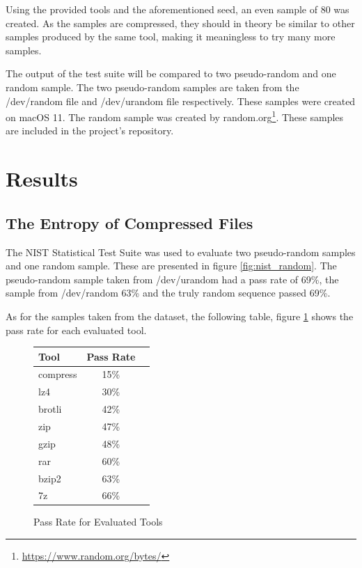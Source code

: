 \documentclass[conference]{IEEEtran}
\begin{document}
Using the provided tools and the aforementioned seed, an even sample of 80 was created. As the samples are compressed, they should in theory be similar to other samples produced by the same tool, making it meaningless to try many more samples\cite{HORNEY2013}.

The output of the test suite will be compared to two pseudo-random and one random sample. The two pseudo-random samples are taken from the /dev/random file and /dev/urandom file respectively. These samples were created on macOS 11. The random sample was created by random.org\footnote{\href{https://www.random.org/bytes/}{https://www.random.org/bytes/}}. These samples are included in the project's repository.


\section{Results}

\subsection{The Entropy of Compressed Files}

The NIST Statistical Test Suite was used to evaluate two pseudo-random samples and one random sample. These are presented in figure \ref{fig:nist_random}. The pseudo-random sample taken from /dev/urandom had a pass rate of 69\%, the sample from /dev/random 63\% and the truly random sequence passed 69\%.

As for the samples taken from the dataset, the following table, figure \ref{fig:nist_samples} shows the pass rate for each evaluated tool.

\begin{figure}[H]
    \centering
    \begin{tabular}{l|c|c}
        Tool & Pass Rate\\ \hline
        compress & 15\%\\
        lz4 & 30\%\\
        brotli & 42\%\\
        zip & 47\% \\
        gzip & 48\%\\
        rar & 60\%\\
        bzip2 & 63\%\\
        7z & 66\%\\
    \end{tabular}
    \caption{Pass Rate for Evaluated Tools}
    \label{fig:nist_samples}
\end{figure}
\end{document}
